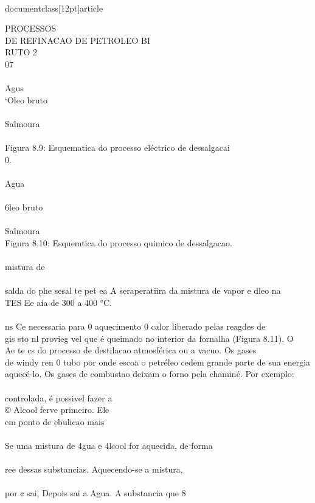 \\documentclass[12pt]{article}
\begin{document}
{PROCESSOS\\
DE REFINACAO DE PETROLEO BI\\
RUTO 2\\
07\\
\\
Agus\\
‘Oleo bruto\\
\\
Salmoura\\
\\
Figura 8.9: Esquematica do processo eléctrico de dessalgacai\\
0.\\
\\
Agua\\
\\
6leo bruto\\
\\
Salmoura\\
Figura 8.10: Esquemtica do processo quimico de dessalgacao.\\
\\
mistura de\\
\\
salda do phe sesal te pet ea A seraperatiira da mistura de vapor e dleo na\\
TES Ee aia de 300 a 400 °C.\\
\\
ns Ce necessaria para 0 aquecimento 0 calor liberado pelas reagdes de\\
gis sto nl provieg vel que é queimado no interior da fornalha (Figura 8.11). O\\
Ae te cs do processo de destilacao atmosférica ou a vacuo. Os gases\\
de windy ren 0 tubo por onde escoa o petréleo cedem grande parte de sua energia\\
aquecé-lo. Os gases de combustao deixam o forno pela chaminé. Por exemplo:\\
\\
controlada, é possivel fazer a\\
© Alcool ferve primeiro. Ele\\
em ponto de ebulicao mais\\
\\
Se uma mistura de 4gua e 4lcool for aquecida, de forma\\
\\
ree dessas substancias. Aquecendo-se a mistura,\\
\\
por ¢ sai, Depois sai a Agua. A substancia que 8\\
}
\end{document}
